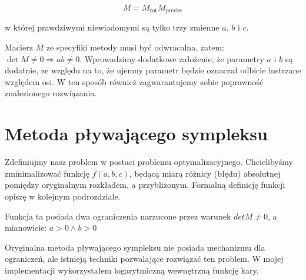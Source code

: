 \documentclass[../main.tex]{subfiles}
\begin{document}
$$
M = M_{\text{rot}} M_{\text{precise}}
$$

w której prawdziwymi niewiadomymi są tylko trzy zmienne $a$, $b$ i $c$.

Macierz $M$ ze specyfiki metody musi być odwracalna, zatem:
  $\det M \neq 0 \Rightarrow ab \neq 0$.
Wprowadzimy dodatkowe założenie, że parametry $a$ i $b$ są dodatnie, ze względu
na to, że ujemny parametr będzie oznaczał odbicie lustrzane względem osi.
W ten sposób również zagwarantujemy sobie poprawność znalezionego rozwiązania.

\section{Metoda pływającego sympleksu}

Zdefiniujmy nasz problem w postaci problemu optymalizacyjnego. Chcielibyśmy
zminimalizować funkcję $f(a,b,c)$, będącą miarą różnicy (błędu) absolutnej
pomiędzy oryginalnym rozkładem, a przybliżonym. Formalną definicję funkcji
opiszę w kolejnym podrozdziale.

Funkcja ta posiada dwa ograniczenia narzucone przez warunek $detM \neq 0$,
a mianowicie:
  $a > 0 \wedge b > 0$

Oryginalna metoda pływającego sympleksu nie posiada mechanizmu dla ograniczeń,
ale istnieją techniki pozwalające rozwiązać ten problem. W mojej implementacji
wykorzystałem logarytmiczną wewnętrzną funkcję kary.


\end{document}
